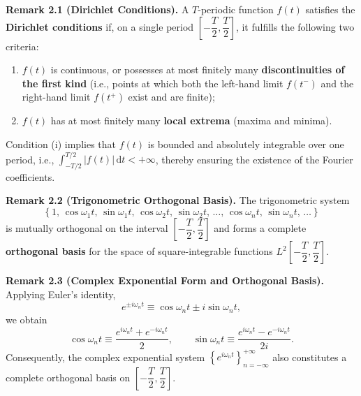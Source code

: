 \documentclass[11pt,a4paper]{article}
\theoremstyle{definition}
\theoremstyle{plain}
\newcommand{\remarkhead}[1]{\par\addvspace{0.6em}\noindent\textbf{#1}\quad\ignorespaces}
\begin{document}
\remarkhead{Remark 2.1 (Dirichlet Conditions).} A $T$-periodic function $f(t)$ satisfies the \textbf{Dirichlet conditions} if, on a single period $\left[-\dfrac{T}{2}, \dfrac{T}{2}\right]$, it fulfills the following two criteria:

\begin{enumerate}
\item $f(t)$ is continuous, or possesses at most finitely many \textbf{discontinuities of the first kind} (i.e., points at which both the left-hand limit $f(t^-)$ and the right-hand limit $f(t^+)$ exist and are finite);
\item $f(t)$ has at most finitely many \textbf{local extrema} (maxima and minima).
\end{enumerate}

\noindent Condition (i) implies that $f(t)$ is bounded and absolutely integrable over one period, i.e., $\int_{-T/2}^{T/2} |f(t)| \, \mathrm{d}t < +\infty$, thereby ensuring the existence of the Fourier coefficients.

\remarkhead{Remark 2.2 (Trigonometric Orthogonal Basis).} The trigonometric system
\begin{equation}
\left\{ 1, \, \cos \omega_1 t, \, \sin \omega_1 t, \, \cos \omega_2 t, \, \sin \omega_2 t, \, \dots, \, \cos \omega_n t, \, \sin \omega_n t, \, \dots \right\}
\end{equation}
is mutually orthogonal on the interval $\left[-\dfrac{T}{2}, \dfrac{T}{2}\right]$ and forms a complete \textbf{orthogonal basis} for the space of square-integrable functions $L^2\left[-\dfrac{T}{2}, \dfrac{T}{2}\right]$.

\remarkhead{Remark 2.3 (Complex Exponential Form and Orthogonal Basis).} Applying Euler's identity,
\begin{equation}
e^{\pm i\omega_n t} \equiv \cos \omega_n t \pm i \sin \omega_n t,
\end{equation}
we obtain
\begin{equation}
\cos \omega_n t \equiv \frac{e^{i\omega_n t} + e^{-i\omega_n t}}{2},
\qquad
\sin \omega_n t \equiv \frac{e^{i\omega_n t} - e^{-i\omega_n t}}{2i}.
\end{equation}
Consequently, the complex exponential system $\left\{ e^{i\omega_n t} \right\}_{n=-\infty}^{+\infty}$ also constitutes a complete orthogonal basis on $\left[-\dfrac{T}{2}, \dfrac{T}{2}\right]$.
\end{document}
